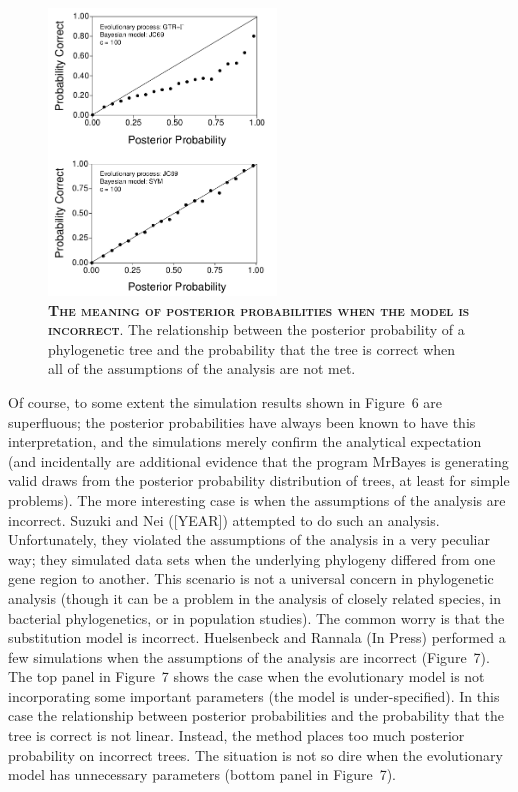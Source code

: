 \documentclass{svmult}
\begin{document}
\begin{figure}[t]
\centering
\includegraphics[height=3in]{fig7}
\caption{\textbf{\textsc{The meaning of posterior probabilities when the model is incorrect}}.
The relationship between the posterior probability of a phylogenetic tree and the probability that the tree is correct when all of the assumptions of
the analysis are not met. }
\label{fig7}
\end{figure}

Of course, to some extent the simulation results shown in Figure~6 are superfluous; the posterior probabilities have always been known to have this interpretation, and
the simulations merely confirm the analytical expectation (and incidentally are additional evidence that the program MrBayes is generating valid draws from
the posterior probability distribution of trees, at least for simple problems). The more interesting case is when the assumptions of the analysis are incorrect. 
Suzuki and Nei ([YEAR]) attempted to do such an analysis. Unfortunately, they violated the assumptions of the analysis in a very peculiar way; they simulated data
sets when the underlying phylogeny differed from one gene region to another. This scenario is not a universal concern in phylogenetic analysis (though it
can be a problem in the analysis of closely related species, in bacterial phylogenetics, or in population studies). The common worry is that the substitution model
is incorrect. Huelsenbeck and Rannala (In Press) performed a few simulations when the assumptions of the analysis are incorrect (Figure~7).
The top panel in Figure~7 shows the case when the evolutionary model is not incorporating some important parameters (the model is under-specified). In this
case the relationship between posterior probabilities and the probability that the tree is correct is not linear. Instead, the method places too much posterior probability
on incorrect trees. The situation is not so dire when the evolutionary model has unnecessary parameters (bottom panel in Figure~7).
\end{document}
